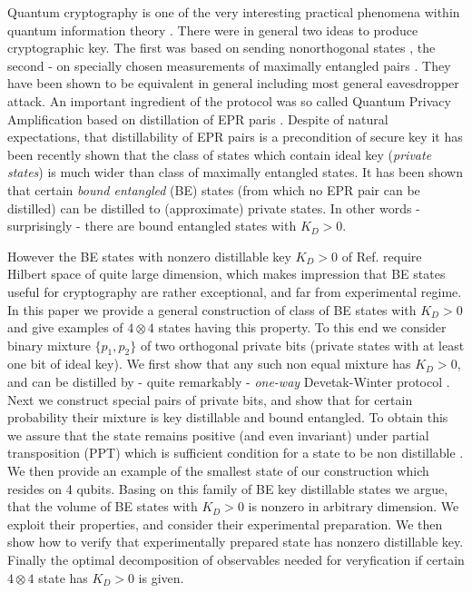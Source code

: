 \documentclass[twocolumn,prl,aps]{revtex4}
\def\ot{\otimes}
\begin{document}
Quantum cryptography is one of the very interesting practical
phenomena within quantum information theory 
\cite{BouwmeesterEZ-book,Nielsen-Chuang,Alber2001,Gruska}.
There were in general two ideas to produce cryptographic key.
The first was based on sending nonorthogonal states
\cite{BB84}, the second - on specially chosen measurements
of maximally entangled pairs \cite{Ekert91}.
They have been shown to be equivalent in general
\cite{Shor-Preskill} including most general eavesdropper attack.
An important ingredient of the protocol was so called 
Quantum Privacy Amplification \cite{QPA} based on
distillation of EPR paris \cite{BBPSSW1996}. Despite of natural
expectations, that distillability of EPR pairs is a precondition 
of secure key it has been recently shown \cite{pptkey,keyhuge} 
that the class of states which contain ideal key ({\it private states}) is 
much wider than class of maximally entangled states. It has been shown
that certain {\it bound entangled} (BE) states \cite{bound}
(from which no EPR pair can be distilled) can be distilled to (approximate)
private states. In other words - surprisingly - 
there are bound entangled states with $K_D >0$. 
    
However  the BE states  with nonzero distillable key $K_D>0$ of  
Ref. \cite{pptkey,keyhuge} require  Hilbert space of quite large 
dimension, which makes impression that BE states  useful for cryptography 
are rather exceptional, and far from experimental regime. 
In this paper we provide a general construction of class of BE states with
$K_D>0$ and give examples of $4\otimes 4$ states having this property.
To this end we consider binary mixture $\{p_1,p_2\}$ 
of two orthogonal private bits (private states with at least one bit of ideal key).
We first show that any such non equal mixture has $K_D >0$, and can be
distilled by - quite remarkably - {\it one-way} Devetak-Winter protocol \cite{DevetakWinter-hash}.
Next we construct special pairs of private bits, and show that for certain probability their mixture is key distillable and bound entangled. To obtain this 
we assure that the state remains positive (and even invariant) under partial transposition (PPT) \cite{Peres96}
which is sufficient condition for a state to be non distillable  \cite{bound}. We then provide
an example of the smallest state of our construction which resides on 4 qubits. 
Basing on this family of BE key distillable states we argue, 
that the volume of BE states with $K_D>0$ is nonzero in arbitrary dimension. 
We exploit their properties, and consider their experimental preparation. 
We then show how to verify that experimentally prepared state has nonzero 
distillable key. Finally the optimal decomposition of observables needed 
for veryfication if certain $4\ot 4$ state has $K_D >0$ is given. 
 
\end{document}
